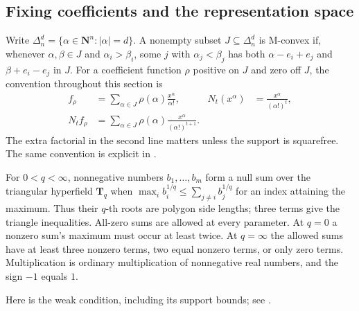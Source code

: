 \subsection{Fixing coefficients and the representation space}
\label{sec:appH-triangular-coefficients}

Write $\Delta_n^d=\{\alpha\in\mathbf N^n:|\alpha|=d\}$.
A nonempty subset $J\subseteq\Delta_n^d$ is M-convex if, whenever
$\alpha,\beta\in J$ and $\alpha_i>\beta_i$, some $j$ with
$\alpha_j<\beta_j$ has both
$\alpha-e_i+e_j$ and $\beta+e_i-e_j$ in $J$.
For a coefficient function $\rho$ positive on $J$ and zero off $J$,
the convention throughout this section is
\begin{equation*}
 \begin{aligned}
 f_\rho&=\sum_{\alpha\in J}\rho(\alpha)\frac{x^\alpha}{\alpha!},
 &N_t(x^\alpha)&=\frac{x^\alpha}{(\alpha!)^t},\\
 N_tf_\rho&=\sum_{\alpha\in J}
          \rho(\alpha)\frac{x^\alpha}{(\alpha!)^{t+1}}.
 \end{aligned}
 \tag{H.97}\label{eq:appH-triangular-normalization}
\end{equation*}
The extra factorial in the second line matters unless the support
is squarefree. The same convention is explicit in
\cite[\S4.4]{BakerHuhKummerLorscheid25TopologicalV3}.

For $0<q<\infty$, nonnegative numbers $b_1,\ldots,b_m$ form a
null sum over the triangular hyperfield $\mathbf T_q$ when
$\max_i b_i^{1/q}\leq\sum_{j\ne i}b_j^{1/q}$ for an index
attaining the maximum. Thus their $q$-th roots are polygon side
lengths; three terms give the triangle inequalities. All-zero sums
are allowed at every parameter. At $q=0$ a nonzero sum's
maximum must occur at least twice. At $q=\infty$ the allowed
sums have at least three nonzero terms, two equal nonzero terms,
or only zero terms. Multiplication is ordinary multiplication of
nonnegative real numbers, and the sign $-1$ equals $1$.

Here is the weak condition, including its support bounds; see
\cite[Definition~4.3 and \S4.5]{BakerHuhKimKummerLorscheid25PolymatroidsV2}.

